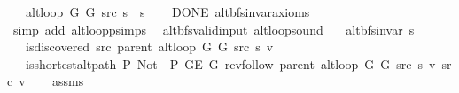 \begin{isabellebody}
\ \ \ {\isachardoublequoteopen}alt{\isacharunderscore}{\kern0pt}loop\ G{}\ G{}\ src\ s\ {\isacharequal}{\kern0pt}\ s{\isachardoublequoteclose}%
\endisataginvisible
{\isafoldinvisible}%
%
\isadeliminvisible
\isanewline
%
\endisadeliminvisible
%
\isadelimproof
\ \ %
\endisadelimproof
%
\isatagproof
{}\isamarkupfalse%
\ DONE\ alt{\isacharunderscore}{\kern0pt}bfs{\isacharunderscore}{\kern0pt}invar{\isacharunderscore}{\kern0pt}axioms\isanewline
\ \ \isamarkupfalse%
\ {\isacharparenleft}{\kern0pt}simp\ add{\isacharcolon}{\kern0pt}\ alt{\isacharunderscore}{\kern0pt}loop{\isacharunderscore}{\kern0pt}psimps{\isacharparenright}{\kern0pt}%
\endisatagproof
{\isafoldproof}%
%
\isadelimproof
\isanewline
%
\endisadelimproof
\isanewline
{}\isamarkupfalse%
\ {\isacharparenleft}{\kern0pt}\ alt{\isacharunderscore}{\kern0pt}bfs{\isacharunderscore}{\kern0pt}valid{\isacharunderscore}{\kern0pt}input{\isacharparenright}{\kern0pt}\ alt{\isacharunderscore}{\kern0pt}loop{\isacharunderscore}{\kern0pt}sound{\isacharcolon}{\kern0pt}\isanewline
\ \ \ {\isachardoublequoteopen}alt{\isacharunderscore}{\kern0pt}bfs{\isacharunderscore}{\kern0pt}invar{\isacharprime}{\kern0pt}{\isacharprime}{\kern0pt}\ s{\isachardoublequoteclose}\isanewline
\ \ \ {\isachardoublequoteopen}is{\isacharunderscore}{\kern0pt}discovered\ src\ {\isacharparenleft}{\kern0pt}parent\ {\isacharparenleft}{\kern0pt}alt{\isacharunderscore}{\kern0pt}loop\ G{}\ G{}\ src\ s{\isacharparenright}{\kern0pt}{\isacharparenright}{\kern0pt}\ v{\isachardoublequoteclose}\isanewline
\ \ \ {\isachardoublequoteopen}is{\isacharunderscore}{\kern0pt}shortest{\isacharunderscore}{\kern0pt}alt{\isacharunderscore}{\kern0pt}path\ P{\isacharprime}{\kern0pt}{\isacharprime}{\kern0pt}\ {\isacharparenleft}{\kern0pt}Not\ {\isasymcirc}\ P{\isacharprime}{\kern0pt}{\isacharprime}{\kern0pt}{\isacharparenright}{\kern0pt}\ {\isacharparenleft}{\kern0pt}G{\isachardot}{\kern0pt}E\ G{\isacharparenright}{\kern0pt}\ {\isacharparenleft}{\kern0pt}rev{\isacharunderscore}{\kern0pt}follow\ {\isacharparenleft}{\kern0pt}parent\ {\isacharparenleft}{\kern0pt}alt{\isacharunderscore}{\kern0pt}loop\ G{}\ G{}\ src\ s{\isacharparenright}{\kern0pt}{\isacharparenright}{\kern0pt}\ v{\isacharparenright}{\kern0pt}\ src\ v{\isachardoublequoteclose}\isanewline
%
\isadelimproof
\ \ %
\endisadelimproof
%
\isatagproof
{}\isamarkupfalse%
\ assms\isanewline
{}\isamarkupfalse%

\end{isabellebody}
